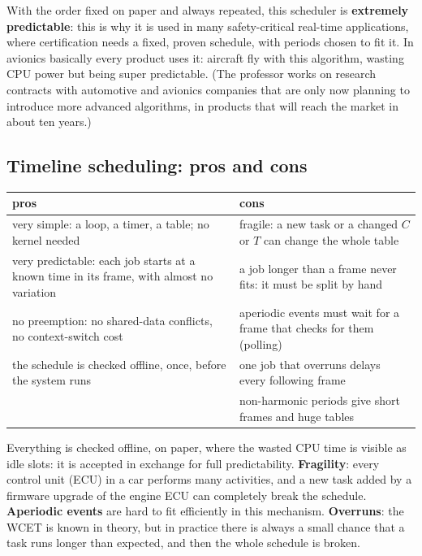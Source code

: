 With the order fixed on paper and always repeated, this scheduler is \textbf{extremely predictable}: this is why it is used in many safety-critical real-time applications, where certification needs a fixed, proven schedule, with periods chosen to fit it. In avionics basically every product uses it: aircraft fly with this algorithm, wasting CPU power but being super predictable. (The professor works on research contracts with automotive and avionics companies that are only now planning to introduce more advanced algorithms, in products that will reach the market in about ten years.)

\subsection{Timeline scheduling: pros and cons}
\begin{center}
\begin{tabular}{p{6.5cm} p{6.5cm}}
\hline
\textbf{pros} & \textbf{cons} \\
\hline
very simple: a loop, a timer, a table; no kernel needed & fragile: a new task or a changed $C$ or $T$ can change the whole table \\
very predictable: each job starts at a known time in its frame, with almost no variation & a job longer than a frame never fits: it must be split by hand \\
no preemption: no shared-data conflicts, no context-switch cost & aperiodic events must wait for a frame that checks for them (polling) \\
the schedule is checked offline, once, before the system runs & one job that overruns delays every following frame \\
 & non-harmonic periods give short frames and huge tables \\
\hline
\end{tabular}
\end{center}
Everything is checked offline, on paper, where the wasted CPU time is visible as idle slots: it is accepted in exchange for full predictability. \textbf{Fragility}: every control unit (ECU) in a car performs many activities, and a new task added by a firmware upgrade of the engine ECU can completely break the schedule. \textbf{Aperiodic events} are hard to fit efficiently in this mechanism. \textbf{Overruns}: the WCET is known in theory, but in practice there is always a small chance that a task runs longer than expected, and then the whole schedule is broken.

